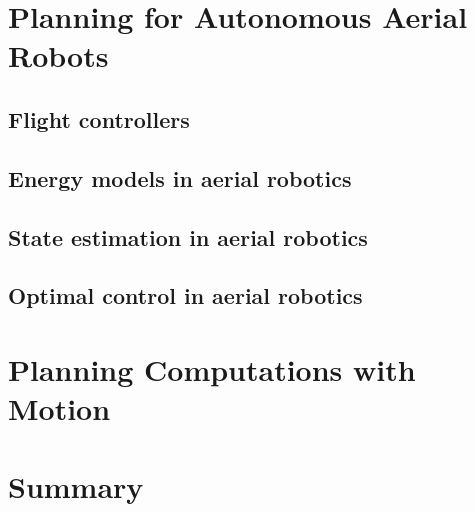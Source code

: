 \section{\color{red}Planning for Autonomous Aerial Robots}
\label{sec:soa-aerial-pl}

\subsection{\color{red}Flight controllers}

\subsection{\color{orange}Energy models in aerial robotics}

\subsection{\color{orange}State estimation in aerial robotics}

\subsection{\color{orange}Optimal control in aerial robotics}


\section{\color{red}Planning Computations with Motion}
\label{sec:soa-comp-motion-pl}

\section{\color{red}Summary}


